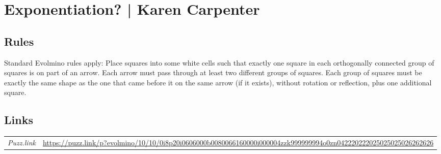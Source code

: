 \section[Exponentiation? | Karen Carpenter {[\emph{Evolmino}]}]{Exponentiation? | {\normalfont Karen Carpenter}}
\label{sec:20-exponentiation-karen-carpenter}

\subsection*{Rules}
\begin{markdown}
Standard Evolmino rules apply: Place squares into some white cells such that exactly one square in each orthogonally connected group of squares is on part of an arrow. Each arrow must pass through at least two different groups of squares. Each group of squares must be exactly the same shape as the one that came before it on the same arrow (if it exists), without rotation or reflection, plus one additional square.
\end{markdown}
\subsection*{Links}
\begin{tabularx}{\textwidth}{l X}
\emph{Puzz.link} & \url{https://puzz.link/p?evolmino/10/10/0i8p20i0606000b0080066160000i000004zzk999999994o0zn042220222025025025026262626} \\
\end{tabularx}
\pagebreak
